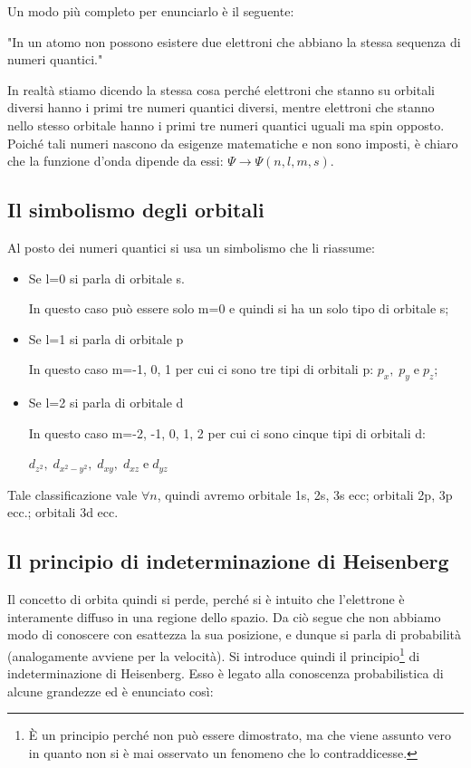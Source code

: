 Un modo più completo per enunciarlo è il seguente:

"In un atomo non possono esistere due elettroni che abbiano la stessa sequenza di numeri quantici."

In realtà stiamo dicendo la stessa cosa perché elettroni che stanno su orbitali diversi hanno i primi tre numeri quantici diversi, mentre elettroni che stanno nello stesso orbitale hanno i primi tre numeri quantici uguali ma spin opposto.\\

Poiché tali numeri nascono da esigenze matematiche e non sono imposti, è chiaro che la funzione d'onda dipende da essi: $\Psi\rightarrow\Psi(n,l,m,s)$.

\subsection{Il simbolismo degli orbitali}
Al posto dei numeri quantici si usa un simbolismo che li riassume:
\begin{itemize}
\item Se l=0 si parla di orbitale s.

In questo caso può essere solo m=0 e quindi si ha un solo tipo di orbitale s;
\item Se l=1 si parla di orbitale p

In questo caso m=-1, 0, 1 per cui ci sono tre tipi di orbitali p: $p_x, \; p_y \; \text{e} \; p_z$;
\item Se l=2 si parla di orbitale d

In questo caso m=-2, -1, 0, 1, 2 per cui ci sono cinque tipi di orbitali d:

$d_{z^2}, \; d_{x^2-y^2}, \; d_{xy}, \; d_{xz} \; \text{e} \; d_{yz}$
\end{itemize}  
Tale classificazione vale $\forall n$, quindi avremo orbitale 1s, 2s, 3s ecc; orbitali 2p, 3p ecc.; orbitali 3d ecc. 

\subsection{Il principio di indeterminazione di Heisenberg}
Il concetto di orbita quindi si perde, perché si è intuito che l'elettrone è interamente diffuso in una regione dello spazio. Da ciò segue che non abbiamo modo di conoscere con esattezza la sua posizione, e dunque si parla di probabilità (analogamente avviene per la velocità).
Si introduce quindi il principio\footnote{È un principio perché non può essere dimostrato, ma che viene assunto vero in quanto non si è mai osservato un fenomeno che lo contraddicesse.} di indeterminazione di Heisenberg. Esso è legato alla conoscenza probabilistica di alcune grandezze ed è enunciato così:

